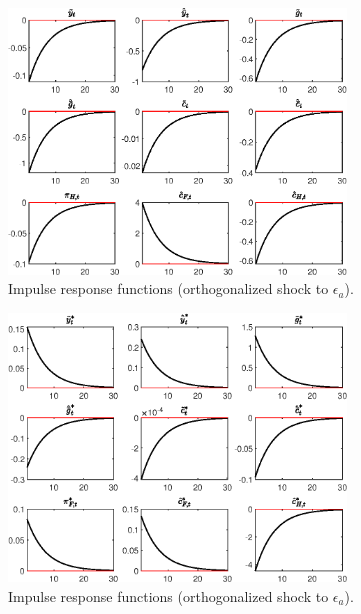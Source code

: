  
\begin{figure}[H]
\centering 
\includegraphics[width=0.80\textwidth]{MODEL_MAIN_3/graphs/MODEL_MAIN_3_IRF_eps_a1}
\caption{Impulse response functions (orthogonalized shock to ${\epsilon_a}$).}\label{Fig:IRF:eps_a:1}
\end{figure}
 
\begin{figure}[H]
\centering 
\includegraphics[width=0.80\textwidth]{MODEL_MAIN_3/graphs/MODEL_MAIN_3_IRF_eps_a2}
\caption{Impulse response functions (orthogonalized shock to ${\epsilon_a}$).}\label{Fig:IRF:eps_a:2}
\end{figure}
 
